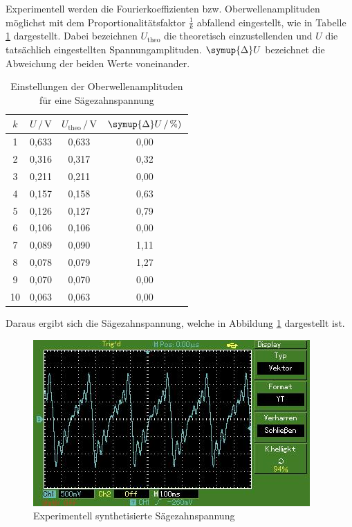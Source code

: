 Experimentell werden die Fourierkoeffizienten bzw. Oberwellenamplituden möglichst mit dem
Proportionalitätsfaktor $\frac{1}{k}$ abfallend eingestellt, wie in Tabelle \ref{tab:Messdaten4}
dargestellt. Dabei bezeichnen $U_\text{theo}$ die theoretisch einzustellenden und $U$ die
tatsächlich eingestellten Spannungamplituden. $\symup{\Delta}U$ bezeichnet die Abweichung der
beiden Werte voneinander.

\begin{table}[H]
    \centering
    \caption{Einstellungen der Oberwellenamplituden für eine Sägezahnspannung}
    \label{tab:Messdaten4}
    \begin{tabular}{c c c c}
    \toprule
    $k$ & $U \,/\, \si{\volt}$ & $U_\text{theo} \,/\, \si{\volt}$ & $\symup{\Delta}U \,/\, \si{\percent})$ \\
    \midrule
    1 & 0,633 & 0,633 & 0,00 \\
    2 & 0,316 & 0,317 & 0,32 \\
    3 & 0,211 & 0,211 & 0,00 \\
    4 & 0,157 & 0,158 & 0,63 \\
    5 & 0,126 & 0,127 & 0,79 \\
    6 & 0,106 & 0,106 & 0,00 \\
    7 & 0,089 & 0,090 & 1,11 \\
    8 & 0,078 & 0,079 & 1,27 \\
    9 & 0,070 & 0,070 & 0,00 \\
   10 & 0,063 & 0,063 & 0,00 \\
    \bottomrule
    \end{tabular}
\end{table}

Daraus ergibt sich die Sägezahnspannung, welche in Abbildung \ref{fig:Ex1}
dargestellt ist.

\begin{figure}[H]
    \centering
    \includegraphics[scale = 0.7]{content/saege.jpg}
    \caption{Experimentell synthetisierte Sägezahnspannung}
    \label{fig:Ex1}
\end{figure}


